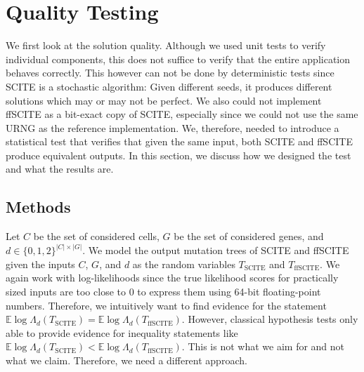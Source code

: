\section{Quality Testing}

We first look at the solution quality. Although we used unit tests to verify individual components, this does not suffice to verify that the entire application behaves correctly. This however can not be done by deterministic tests since \ac{SCITE} is a stochastic algorithm: Given different seeds, it produces different solutions which may or may not be perfect. We also could not implement \ac{ffSCITE} as a bit-exact copy of \ac{SCITE}, especially since we could not use the same \ac{URNG} as the reference implementation. We, therefore, needed to introduce a statistical test that verifies that given the same input, both \ac{SCITE} and \ac{ffSCITE} produce equivalent outputs. In this section, we discuss how we designed the test and what the results are.

\subsection{Methods}

Let $C$ be the set of considered cells, $G$ be the set of considered genes, and $d \in \{0,1,2\}^{|C| \times |G|}$. We model the output mutation trees of \ac{SCITE} and \ac{ffSCITE} given the inputs $C$, $G$, and $d$ as the random variables $T_\mathrm{SCITE}$ and $T_\mathrm{ffSCITE}$. We again work with log-likelihoods since the true likelihood scores for practically sized inputs are too close to 0 to express them using 64-bit floating-point numbers. Therefore, we intuitively want to find evidence for the statement $\mathbb{E} \log\Lambda_d(T_\mathrm{SCITE}) = \mathbb{E} \log\Lambda_d(T_\mathrm{ffSCITE})$. However, classical hypothesis tests only able to provide evidence for inequality statements like $\mathbb{E} \log\Lambda_d(T_\mathrm{SCITE}) < \mathbb{E} \log\Lambda_d(T_\mathrm{ffSCITE})$. This is not what we aim for and not what we claim. Therefore, we need a different approach.

